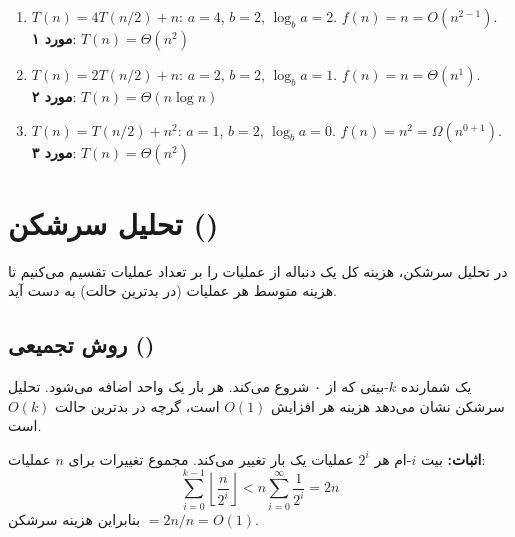 \documentclass{matinbook}
\begin{document}
    \begin{example}
        \begin{enumerate}
            \item $T(n) = 4T(n/2) + n$:
            $a = 4$, $b = 2$, $\log_{b}a = 2$.
            $f(n) = n = O(n^{2 - 1})$.
            \textbf{مورد ۱}: $T(n) = \Theta(n^{2})$
            
            \item $T(n) = 2T(n/2) + n$:
            $a = 2$, $b = 2$, $\log_{b}a = 1$.
            $f(n) = n = \Theta(n^{1})$.
            \textbf{مورد ۲}: $T(n) = \Theta(n \log n)$
            
            \item $T(n) = T(n/2) + n^{2}$:
            $a = 1$, $b = 2$, $\log_{b}a = 0$.
            $f(n) = n^{2} = \Omega(n^{0 + 1})$.
            \textbf{مورد ۳}: $T(n) = \Theta(n^{2})$
        \end{enumerate}
        \label{ex:master-examples}
    \end{example}
    
    \section{تحلیل سرشکن ()}
    
    در تحلیل سرشکن،
    هزینه کل یک دنباله از عملیات را بر تعداد عملیات
    تقسیم می‌کنیم تا هزینه متوسط هر عملیات
    (در بدترین حالت) به دست آید.
    
    \subsection{روش تجمیعی ()}
    
    \begin{example}
        یک شمارنده $k$-بیتی که از ۰ شروع می‌کند.
        هر بار یک واحد اضافه می‌شود.
        تحلیل سرشکن نشان می‌دهد هزینه هر افزایش
        $O(1)$ است، گرچه در بدترین حالت $O(k)$ است.
        
        \textbf{اثبات:} بیت $i$-ام هر $2^{i}$ عملیات
        یک بار تغییر می‌کند. مجموع تغییرات برای
        $n$ عملیات:
        \[
        \sum_{i=0}^{k-1} \left\lfloor \frac{n}{2^{i}} \right\rfloor
        < n \sum_{i=0}^{\infty} \frac{1}{2^{i}} = 2n
        \]
        بنابراین هزینه سرشکن $= 2n/n = O(1)$.
        \label{ex:binary-counter}
    \end{example}
    
\end{document}
